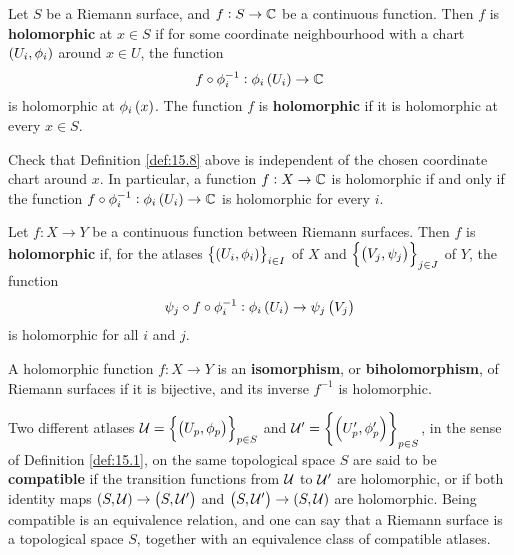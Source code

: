 \begin{definition}
\label{def:15.8}
Let $ S $ be a Riemann surface, and $ f : S \to \mathbb{C} $ be a continuous function. Then $ f $ is \textbf{holomorphic} at $ x \in S $ if for some coordinate neighbourhood with a chart $ \br{U_i, \phi_i} $ around $ x \in U $, the function
$$ f \circ \phi_i^{-1} : \phi_i\br{U_i} \to \CC $$
is holomorphic at $ \phi_i\br{x} $. The function $ f $ is \textbf{holomorphic} if it is holomorphic at every $ x \in S $.
\end{definition}

\begin{exercise**}
Check that Definition \ref{def:15.8} above is independent of the chosen coordinate chart around $ x $. In particular, a function $ f : X \to \mathbb{C} $ is holomorphic if and only if the function $ f \circ \phi_i^{-1} : \phi_i\br{U_i} \to \CC $ is holomorphic for every $ i $.
\end{exercise**}

\begin{definition}
Let $ f : X \to Y $ be a continuous function between Riemann surfaces. Then $ f $ is \textbf{holomorphic} if, for the atlases $ \cbr{\br{U_i, \phi_i}}_{i \in I} $ of $ X $ and $ \cbr{\br{V_j, \psi_j}}_{j \in J} $ of $ Y $, the function
$$ \psi_j \circ f \circ \phi_i^{-1} : \phi_i\br{U_i} \to \psi_j\br{V_j} $$
is holomorphic for all $ i $ and $ j $.
\end{definition}

\begin{definition}
A holomorphic function $ f : X \to Y $ is an \textbf{isomorphism}, or \textbf{biholomorphism}, of Riemann surfaces if it is bijective, and its inverse $ f^{-1} $ is holomorphic.
\end{definition}

\begin{remark}
\label{rem:15.11}
Two different atlases $ \UUU = \cbr{\br{U_p, \phi_p}}_{p \in S} $ and $ \UUU' = \cbr{\br{U'_p, \phi'_p}}_{p \in S} $, in the sense of Definition \ref{def:15.1}, on the same topological space $ S $ are said to be \textbf{compatible} if the transition functions from $ \mathcal{U} $ to $ \mathcal{U}' $ are holomorphic, or if both identity maps $ \br{S, \UUU} \to \br{S, \UUU'} $ and $ \br{S, \UUU'} \to \br{S, \UUU} $ are holomorphic. Being compatible is an equivalence relation, and one can say that a Riemann surface is a topological space $ S $, together with an equivalence class of compatible atlases.
\end{remark}

